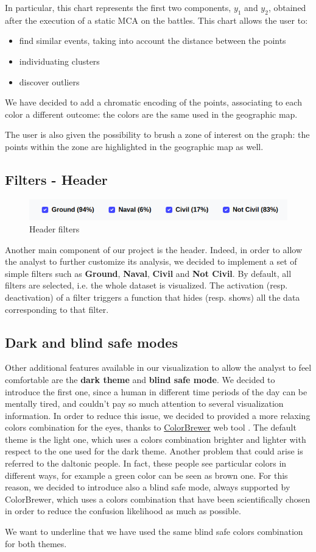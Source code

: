 In particular, this chart represents the first two components, $y_1$ and $y_2$, obtained after the execution of a static MCA on the battles. This chart allows the user to:
\begin{itemize}
    \item find similar events, taking into account the distance between the points
    \item individuating clusters
    \item discover outliers
\end{itemize}

We have decided to add a chromatic encoding of the points, associating to each color a different outcome: the colors are the same used in the geographic map.

The user is also given the possibility to brush a zone of interest on the graph: the points within the zone are highlighted in the geographic map as well.

\subsection{Filters - Header}
\begin{figure}[h]
    \centering
    \includegraphics[scale=0.32]{./images/header_filters.png}
    \caption{Header filters}
\end{figure}
Another main component of our project is the header. Indeed, in order to allow the analyst to further customize its analysis, we decided to implement a set of simple filters such as \textbf{Ground}, \textbf{Naval}, \textbf{Civil} and \textbf{Not Civil}. By default, all filters are selected, i.e. the whole dataset is visualized. The activation (resp. deactivation) of a filter triggers a function that hides (resp. shows) all the data corresponding to that filter.

\subsection{Dark and blind safe modes}
Other additional features available in our visualization to allow the analyst to feel comfortable are the \textbf{dark theme} and \textbf{blind safe mode}. We decided to introduce the first one, since a human in different time periods of the day can be mentally tired, and couldn't pay so much attention to several visualization information. In order to reduce this issue, we decided to provided a more relaxing colors combination for the eyes, thanks to \href{https://colorbrewer2.org/}{ColorBrewer} web tool \cite{HB03}. The default theme is the light one, which uses a colors combination brighter and lighter with respect to the one used for the dark theme. Another problem that could arise is referred to the daltonic people. In fact, these people see particular colors in different ways, for example a green color can be seen as brown one. For this reason, we decided to introduce also a blind safe mode, always supported by ColorBrewer, which uses a colors combination that have been scientifically chosen in order to reduce the confusion likelihood as much as possible.

We want to underline that we have used the same blind safe colors combination for both themes.